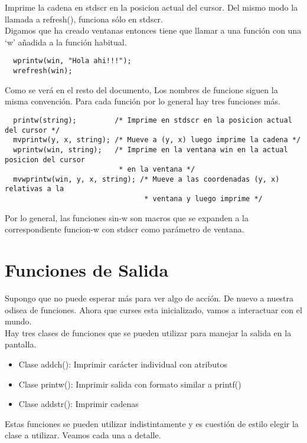 \documentclass{article}
\begin{document}
Imprime la cadena en stdscr en la posicion actual del cursor. Del mismo modo la
llamada a refresh(), funciona sólo en stdscr.\\

Digamos que ha creado ventanas entonces tiene que llamar a una función con una
‘w’ añadida a la función habitual.

\begin{verbatim}
  wprintw(win, "Hola ahi!!!");
  wrefresh(win);
\end{verbatim}

Como se verá en el resto del documento, Los nombres de funcione siguen la misma
convención. Para cada función por lo general hay tres funciones más.

\begin{verbatim}
  printw(string);         /* Imprime en stdscr en la posicion actual del cursor */
  mvprintw(y, x, string); /* Mueve a (y, x) luego imprime la cadena */
  wprintw(win, string);   /* Imprime en la ventana win en la actual posicion del cursor
                           * en la ventana */
  mvwprintw(win, y, x, string); /* Mueve a las coordenadas (y, x) relativas a la
                                 * ventana y luego imprime */
\end{verbatim}

Por lo general, las funciones sin-w son macros que se expanden a la
correspondiente funcion-w con stdscr como parámetro de ventana.

\section{Funciones de Salida}%
Supongo que no puede esperar más para ver algo de acción. De nuevo a nuestra
odisea de funciones. Ahora que curses esta inicializado, vamos a interactuar
con el mundo.\\

Hay tres clases de funciones que se pueden utilizar para manejar la salida en
la pantalla.\\

\begin{itemize}
  \item Clase addch(): Imprimir carácter individual con atributos
  \item Clase printw(): Imprimir salida con formato similar a printf()
  \item Clase addstr(): Imprimir cadenas
\end{itemize}

Estas funciones se pueden utilizar indistintamente y es cuestión de estilo
elegir la clase a utilizar. Veamos cada una a detalle.
\end{document}
